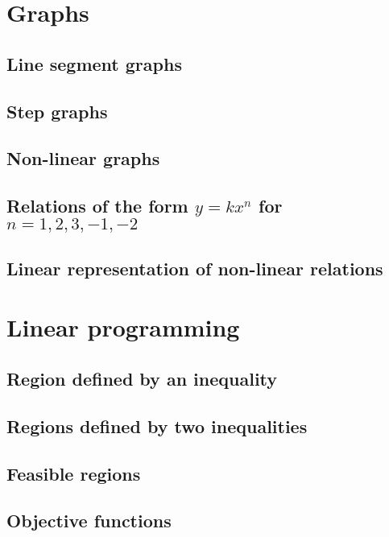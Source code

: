 \documentclass[a4paper,11pt]{article}
\begin{document}
\newpage

\section{Graphs}
\begin{outline}

\0
\subsection{Line segment graphs}

\0
\subsection{Step graphs}

\0
\subsection{Non-linear graphs}

\0
\subsection{Relations of the form $y = kx^n$ for $n = 1, 2, 3, -1, -2$}

\0
\subsection{Linear representation of non-linear relations}

\end{outline}

\newpage

\section{Linear programming}
\begin{outline}

\0
\subsection{Region defined by an inequality}

\0
\subsection{Regions defined by two inequalities}

\0
\subsection{Feasible regions}

\0
\subsection{Objective functions}

\end{outline}
\end{document}
